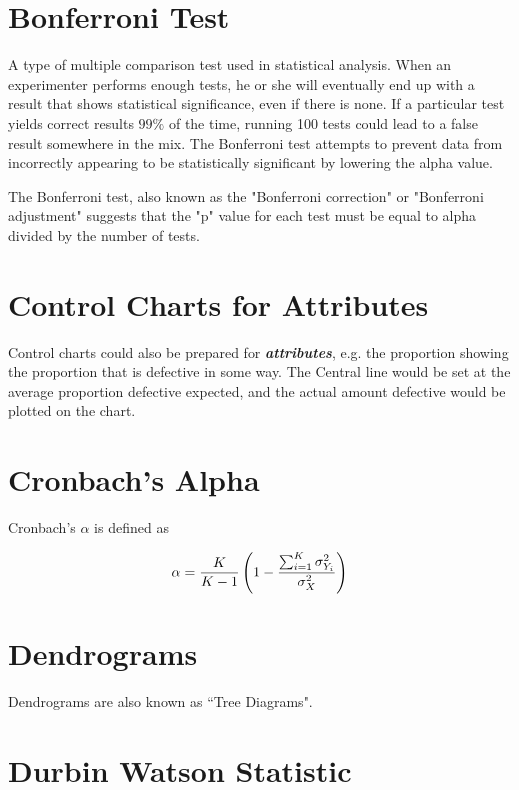 
\section{Bonferroni Test}

A type of multiple comparison test used in statistical analysis. When an experimenter performs enough tests, he or she will eventually end up with a result that shows statistical significance, even if there is none. If a particular test yields correct results $99\%$ of the time, running 100 tests could lead to a false result somewhere in the mix. The Bonferroni test attempts to prevent data from incorrectly appearing to be statistically significant by lowering the alpha value.

The Bonferroni test, also known as the "Bonferroni correction" or "Bonferroni adjustment" suggests that the "p" value for each test must be equal to alpha divided by the number of tests.
\section{Control Charts for Attributes}

Control charts could also be prepared for \emph{\textbf{attributes}}, e.g. the proportion
showing the proportion that is defective in some way.
The Central line would be set at the average proportion defective expected, and
the actual amount defective would be plotted on the chart.
\section{Cronbach's Alpha}

Cronbach's $\alpha$ is defined as

\[
\alpha = {K \over K-1 } \left(1 - {\sum_{i=1}^K \sigma^2_{Y_i}\over \sigma^2_X}\right)
\]



\section{Dendrograms}
Dendrograms are also known as ``Tree Diagrams".
\section{Durbin Watson Statistic}

